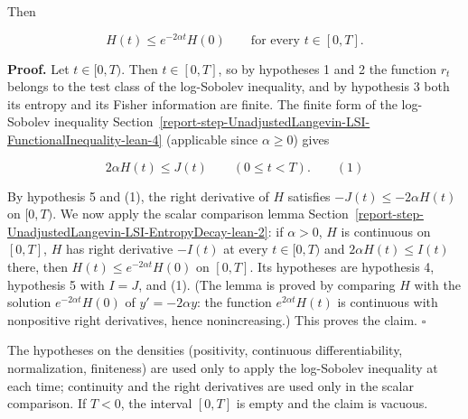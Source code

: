\documentclass[11pt,a4paper]{report}
\begin{document}
Then


\[H(t)\le e^{-2\alpha t}H(0)\qquad\text{for every }t\in[0,T].\]


\textbf{Proof.} Let \(t\in[0,T)\). Then \(t\in[0,T]\), so by hypotheses 1 and 2 the function \(r_t\) belongs to the test class of the log-Sobolev inequality, and by hypothesis 3 both its entropy and its Fisher information are finite. The finite form of the log-Sobolev inequality Section~\ref{report-step-UnadjustedLangevin-LSI-FunctionalInequality-lean-4} (applicable since \(\alpha\ge0\)) gives


\[2\alpha H(t)\le J(t)\qquad(0\le t<T).\qquad(1)\]


By hypothesis 5 and (1), the right derivative of \(H\) satisfies \(-J(t)\le-2\alpha H(t)\) on \([0,T)\). We now apply the scalar comparison lemma Section~\ref{report-step-UnadjustedLangevin-LSI-EntropyDecay-lean-2}: if \(\alpha>0\), \(H\) is continuous on \([0,T]\), \(H\) has right derivative \(-I(t)\) at every \(t\in[0,T)\) and \(2\alpha H(t)\le I(t)\) there, then \(H(t)\le e^{-2\alpha t}H(0)\) on \([0,T]\). Its hypotheses are hypothesis 4, hypothesis 5 with \(I=J\), and (1). (The lemma is proved by comparing \(H\) with the solution \(e^{-2\alpha t}H(0)\) of \(y'=-2\alpha y\): the function \(e^{2\alpha t}H(t)\) is continuous with nonpositive right derivatives, hence nonincreasing.) This proves the claim. \(\square\)




The hypotheses on the densities (positivity, continuous differentiability, normalization, finiteness) are used only to apply the log-Sobolev inequality at each time; continuity and the right derivatives are used only in the scalar comparison. If \(T<0\), the interval \([0,T]\) is empty and the claim is vacuous.
\end{document}

